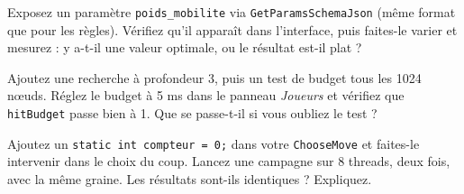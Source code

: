 \begin{nkexo}
Exposez un paramètre \texttt{poids\_mobilite} via \texttt{GetParamsSchemaJson}
(même format que pour les règles). Vérifiez qu'il apparaît dans l'interface, puis
faites-le varier et mesurez : y a-t-il une valeur optimale, ou le résultat est-il
plat ?
\end{nkexo}

\begin{nkexo}[3 — Le budget]
Ajoutez une recherche à profondeur 3, puis un test de budget tous les 1024 nœuds.
Réglez le budget à 5 ms dans le panneau \emph{Joueurs} et vérifiez que
\texttt{hitBudget} passe bien à 1. Que se passe-t-il si vous oubliez le test ?
\end{nkexo}

\begin{nkexo}
Ajoutez un \texttt{static int compteur = 0;} dans votre \texttt{ChooseMove} et
faites-le intervenir dans le choix du coup. Lancez une campagne sur 8 threads,
deux fois, avec la même graine. Les résultats sont-ils identiques ? Expliquez.
\end{nkexo}
